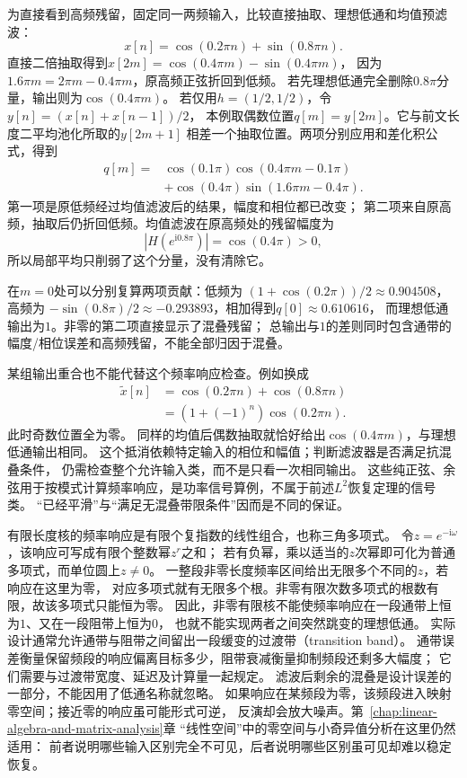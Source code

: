 为直接看到高频残留，固定同一两频输入，比较直接抽取、理想低通和均值预滤波：
\[
  x[n]=\cos(0.2\pi n)+\sin(0.8\pi n).
\]
直接二倍抽取得到$x[2m]=\cos(0.4\pi m)-\sin(0.4\pi m)$，
因为$1.6\pi m=2\pi m-0.4\pi m$，原高频正弦折回到低频。
若先理想低通完全删除$0.8\pi$分量，输出则为$\cos(0.4\pi m)$。
若仅用$h=(1/2,1/2)$，令$y[n]=(x[n]+x[n-1])/2$，
本例取偶数位置$q[m]=y[2m]$。它与前文长度二平均池化所取的$y[2m+1]$
相差一个抽取位置。两项分别应用和差化积公式，得到
\[
 \begin{aligned}
  q[m]={}&\cos(0.1\pi)\cos(0.4\pi m-0.1\pi)\\
        &+\cos(0.4\pi)\sin(1.6\pi m-0.4\pi).
 \end{aligned}
\]
第一项是原低频经过均值滤波后的结果，幅度和相位都已改变；
第二项来自原高频，抽取后仍折回低频。均值滤波在原高频处的残留幅度为
\[
 |H(e^{\mathrm i0.8\pi})|=\cos(0.4\pi)>0,
\]
所以局部平均只削弱了这个分量，没有清除它。

在$m=0$处可以分别复算两项贡献：低频为
$(1+\cos(0.2\pi))/2\approx0.904508$，高频为
$-\sin(0.8\pi)/2\approx-0.293893$，相加得到$q[0]\approx0.610616$，
而理想低通输出为$1$。非零的第二项直接显示了混叠残留；
总输出与$1$的差则同时包含通带的幅度/相位误差和高频残留，不能全部归因于混叠。

某组输出重合也不能代替这个频率响应检查。例如换成
\[
 \begin{aligned}
  \widetilde x[n]&=\cos(0.2\pi n)+\cos(0.8\pi n)\\
                 &=(1+(-1)^n)\cos(0.2\pi n).
 \end{aligned}
\]
此时奇数位置全为零。
同样的均值后偶数抽取就恰好给出$\cos(0.4\pi m)$，与理想低通输出相同。
这个抵消依赖特定输入的相位和幅值；判断滤波器是否满足抗混叠条件，
仍需检查整个允许输入类，而不是只看一次相同输出。
这些纯正弦、余弦用于按模式计算频率响应，是功率信号算例，不属于前述$L^2$恢复定理的信号类。
“已经平滑”与“满足无混叠带限条件”因而是不同的保证。

有限长度核的频率响应是有限个复指数的线性组合，也称三角多项式。
令$z=e^{-\mathrm i\omega}$，该响应可写成有限个整数幂$z^r$之和；
若有负幂，乘以适当的$z$次幂即可化为普通多项式，而单位圆上$z\neq0$。
一整段非零长度频率区间给出无限多个不同的$z$，若响应在这里为零，
对应多项式就有无限多个根。非零有限次数多项式的根数有限，故该多项式只能恒为零。
因此，非零有限核不能使频率响应在一段通带上恒为$1$、又在一段阻带上恒为$0$，
也就不能实现两者之间突然跳变的理想低通。
实际设计通常允许通带与阻带之间留出一段缓变的过渡带（transition band）。
通带误差衡量保留频段的响应偏离目标多少，阻带衰减衡量抑制频段还剩多大幅度；
它们需要与过渡带宽度、延迟及计算量一起规定。
滤波后剩余的混叠是设计误差的一部分，不能因用了低通名称就忽略。
如果响应在某频段为零，该频段进入映射零空间；接近零的响应虽可能形式可逆，
反演却会放大噪声。第~\ref{chap:linear-algebra-and-matrix-analysis}章
“线性空间”中的零空间与小奇异值分析在这里仍然适用：
前者说明哪些输入区别完全不可见，后者说明哪些区别虽可见却难以稳定恢复。

